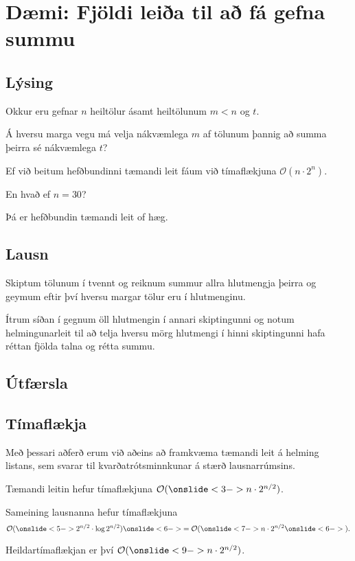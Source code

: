 \section{Dæmi: Fjöldi leiða til að fá gefna summu}
\subsection{Lýsing}
{
    {
        \item<1-> Okkur eru gefnar $n$ heiltölur ásamt heiltölunum $m < n$ og $t$.
        \item<2-> Á hversu marga vegu má velja nákvæmlega $m$ af tölunum þannig að summa þeirra sé nákvæmlega $t$?
        \item<3-> Ef við beitum hefðbundinni tæmandi leit fáum við tímaflækjuna $\mathcal{O}(n \cdot 2^n)$.
        \item<4-> En hvað ef $n = 30$?
        \item<5-> Þá er hefðbundin tæmandi leit of hæg.
    }
}

\subsection{Lausn}
{
    {
        \item<1-> Skiptum tölunum í tvennt og reiknum summur allra hlutmengja þeirra og geymum eftir því hversu margar tölur eru í hlutmenginu.
        \item<2-> Ítrum síðan í gegnum öll hlutmengin í annari skiptingunni
            og notum helmingunarleit til að telja hversu mörg hlutmengi í hinni skiptingunni hafa réttan fjölda talna og rétta summu.
    }
}

\subsection{Útfærsla}
{
}

\subsection{Tímaflækja}
{
    {
        \item<1-> Með þessari aðferð erum við aðeins að framkvæma tæmandi leit á helming listans,
            sem svarar til kvarðatrótsminnkunar á stærð lausnarrúmsins.
        \item<2-> Tæmandi leitin hefur tímaflækjuna $\mathcal{O}(\onslide<3->{n \cdot 2^{n/2}})$.
        \item<4-> Sameining lausnanna hefur tímaflækjuna
                    \[
                        \mathcal{O}(
                        \onslide<5->{2^{n/2} \cdot \log 2^{n/2}}
                        )
                        \onslide<6->{ = \mathcal{O}(}
                        \onslide<7->{n \cdot 2^{n/2}}
                        \onslide<6->{).}
                    \]
        \item<8-> Heildartímaflækjan er því $\mathcal{O}(\onslide<9->{n \cdot 2^{n/2}})$.
    }
}

